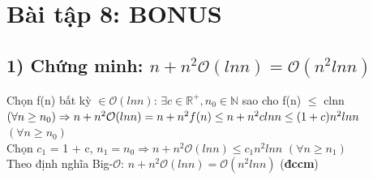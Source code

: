 \documentclass[10pt,a4paper]{article}
\begin{document}
\section*{Bài tập 8: BONUS } 
\subsection*{1) Chứng minh: $n + n^2\mathcal{O}(lnn) = \mathcal{O}(n^2lnn)$}
Chọn f(n) bất kỳ $\in \mathcal{O}(lnn)$: $\exists c \in \mathbb{R^+} , n_0 \in \mathbb{N}$ sao cho f(n) $\leq$ clnn $(\forall n \geq n_0) \\
\Rightarrow n + n^2\mathcal{O}(lnn) =n + n^2f(n) \leq n + n^2clnn \leq (1 + c)n^2lnn$ $(\forall n \geq n_0)$ \\
Chọn $c_1$ = 1 + c, $n_1 = n_0 \Rightarrow n + n^2\mathcal{O}(lnn) \leq c_1n^2lnn$ $(\forall n \geq n_1)$ \\
Theo định nghĩa Big-$\mathcal{O}$: $n + n^2\mathcal{O}(lnn) = \mathcal{O}(n^2lnn)$ (\textbf{đccm})
\end{document}
